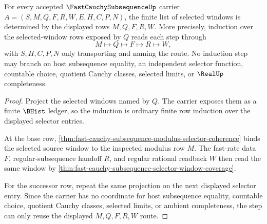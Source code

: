 \begin{theorem}
\label{thm:fast-cauchy-subsequence-selected-window-induction}
For every accepted $\FastCauchySubsequenceUp$ carrier $A=(S,M,Q,F,R,W,E,H,C,P,N)$, the finite list of selected windows is determined by the displayed rows $M,Q,F,R,W$. More precisely, induction over the selected-window rows exposed by $Q$ reads each step through
$$
M\longmapsto Q\longmapsto F\longmapsto R\longmapsto W ,
$$
with $S,H,C,P,N$ only transporting and naming the route. No induction step may branch on host subsequence equality, an independent selector function, countable choice, quotient Cauchy classes, selected limits, or $\RealUp$ completeness.
\end{theorem}
\begin{proof}
Project the selected windows named by $Q$. The carrier exposes them as a finite $\BHist$ ledger, so the induction is ordinary finite row induction over the displayed selector entries.

At the base row, \autoref{thm:fast-cauchy-subsequence-modulus-selector-coherence} binds the selected source window to the inspected modulus row $M$. The fast-rate data $F$, regular-subsequence handoff $R$, and regular rational readback $W$ then read the same window by \autoref{thm:fast-cauchy-subsequence-selector-window-coverage}.

For the successor row, repeat the same projection on the next displayed selector entry. Since the carrier has no coordinate for host subsequence equality, countable choice, quotient Cauchy classes, selected limits, or ambient completeness, the step can only reuse the displayed $M,Q,F,R,W$ route.
\end{proof}

